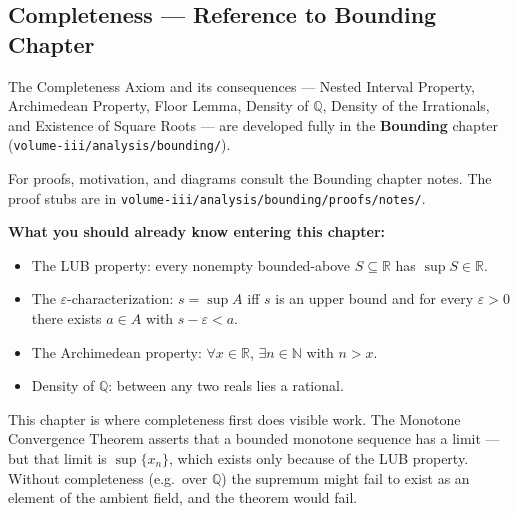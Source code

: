 %
%
%
%

\subsection{Completeness --- Reference to Bounding Chapter}

\begin{tcolorbox}[colback=gray!6, colframe=gray!40, arc=2pt,
  left=6pt, right=6pt, top=4pt, bottom=4pt,
  title={\small\textbf{These results are proved in the Bounding chapter}},
  fonttitle=\small\bfseries]
The Completeness Axiom and its consequences --- Nested Interval Property,
Archimedean Property, Floor Lemma, Density of $\mathbb{Q}$, Density of the
Irrationals, and Existence of Square Roots --- are developed fully in the
\textbf{Bounding} chapter (\texttt{volume-iii/analysis/bounding/}).

\medskip

For proofs, motivation, and diagrams consult the Bounding chapter notes.
The proof stubs are in
\texttt{volume-iii/analysis/bounding/proofs/notes/}.

\medskip
\textbf{What you should already know entering this chapter:}
\begin{itemize}
  \item The LUB property: every nonempty bounded-above $S \subseteq \mathbb{R}$
        has $\sup S \in \mathbb{R}$.
  \item The $\varepsilon$-characterization: $s = \sup A$ iff $s$ is an upper
        bound and for every $\varepsilon > 0$ there exists $a \in A$ with
        $s - \varepsilon < a$.
  \item The Archimedean property: $\forall x \in \mathbb{R}$,
        $\exists n \in \mathbb{N}$ with $n > x$.
  \item Density of $\mathbb{Q}$: between any two reals lies a rational.
\end{itemize}
\end{tcolorbox}

\begin{remark*}
This chapter is where completeness first does visible work.
The Monotone Convergence Theorem asserts that a bounded monotone sequence
has a limit --- but that limit is $\sup\{x_n\}$, which exists only because
of the LUB property.
Without completeness (e.g.\ over $\mathbb{Q}$) the supremum might fail to
exist as an element of the ambient field, and the theorem would fail.
\end{remark*}
